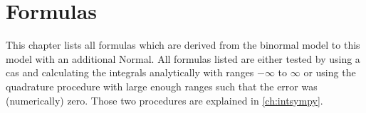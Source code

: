 \chapter{Formulas}\label{ch:formulas}

This chapter lists all formulas which are derived from the binormal model to this model with an additional Normal.
All formulas listed are either tested by using a \gls{cas} and calculating the integrals analytically with ranges $-\infty$ to $\infty$ or using the quadrature procedure with large enough ranges such that the error was (numerically) zero.
Those two procedures are explained in \cref{ch:intsympy}.















